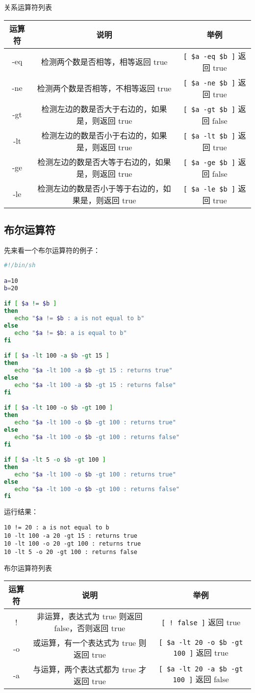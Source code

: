 关系运算符列表
\begin{center}
\begin{tabular}{c|c|c}
运算符&	说明	&举例\\
\hline
-eq	&检测两个数是否相等，相等返回 true	&\verb|[ $a -eq $b ]| 返回 true\\
-ne	&检测两个数是否相等，不相等返回 true	&\verb|[ $a -ne $b ]| 返回 true\\
-gt	&检测左边的数是否大于右边的，如果是，则返回 true&	\verb|[ $a -gt $b ]| 返回 false\\
-lt	&检测左边的数是否小于右边的，如果是，则返回 true	&\verb|[ $a -lt $b ]| 返回 true\\
-ge	&检测左边的数是否大等于右边的，如果是，则返回 true&\verb|[ $a -ge $b ]| 返回 false\\
-le	&检测左边的数是否小于等于右边的，如果是，则返回 true&\verb|[ $a -le $b ]| 返回 true
\end{tabular}
\end{center}


\subsection{布尔运算符}
先来看一个布尔运算符的例子：
\begin{lstlisting}[language=sh]
#!/bin/sh

a=10
b=20

if [ $a != $b ]
then
   echo "$a != $b : a is not equal to b"
else
   echo "$a != $b: a is equal to b"
fi

if [ $a -lt 100 -a $b -gt 15 ]
then
   echo "$a -lt 100 -a $b -gt 15 : returns true"
else
   echo "$a -lt 100 -a $b -gt 15 : returns false"
fi

if [ $a -lt 100 -o $b -gt 100 ]
then
   echo "$a -lt 100 -o $b -gt 100 : returns true"
else
   echo "$a -lt 100 -o $b -gt 100 : returns false"
fi

if [ $a -lt 5 -o $b -gt 100 ]
then
   echo "$a -lt 100 -o $b -gt 100 : returns true"
else
   echo "$a -lt 100 -o $b -gt 100 : returns false"
fi
\end{lstlisting}
运行结果：
\begin{verbatim}
10 != 20 : a is not equal to b
10 -lt 100 -a 20 -gt 15 : returns true
10 -lt 100 -o 20 -gt 100 : returns true
10 -lt 5 -o 20 -gt 100 : returns false
\end{verbatim}

布尔运算符列表
{\wuhao
\begin{center}
\begin{tabular}{c|c|c}
运算符&	说明	&举例\\
\hline
!	&非运算，表达式为 true 则返回 false，否则返回 true&	\verb|[ ! false ]| 返回 true\\
-o	&或运算，有一个表达式为 true 则返回 true&	\verb|[ $a -lt 20 -o $b -gt 100 ]| 返回 true\\
-a	&与运算，两个表达式都为 true 才返回 true&	\verb|[ $a -lt 20 -a $b -gt 100 ]| 返回 false
\end{tabular}
\end{center}}


